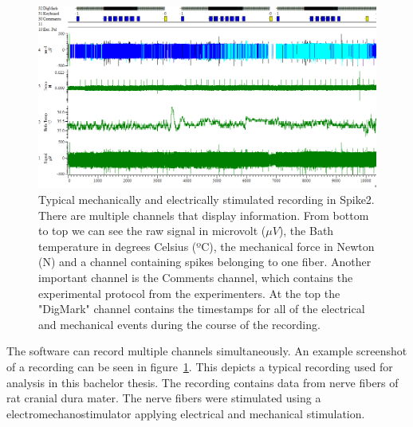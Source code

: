 \begin{figure}
	\includegraphics[width = \textwidth]{src/pic/Spike2_screenshot}
	\caption{Typical mechanically and electrically stimulated recording in Spike2. There are multiple channels that display information. From bottom to top we can see the raw signal in microvolt ($\mu V$), the Bath temperature in degrees Celsius (ºC), the mechanical force in Newton (N) and a channel containing spikes belonging to one fiber. Another important channel is the Comments channel, which contains the experimental protocol from the experimenters. At the top the "DigMark" channel contains the timestamps for all of the electrical and mechanical events during the course of the recording.}
	\label{fig:spike2}
\end{figure}
The software can record multiple channels simultaneously. An example screenshot of a recording can be seen in figure~\ref{fig:spike2}. This depicts a typical recording used for analysis in this bachelor thesis. The recording contains data from nerve fibers of rat cranial dura mater. The nerve fibers were stimulated using a electromechanostimulator applying electrical and mechanical stimulation. 

